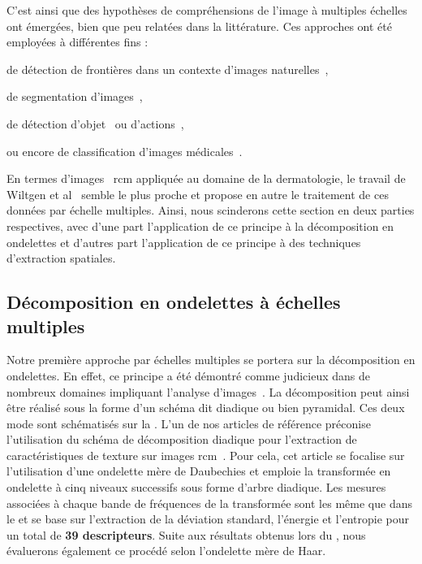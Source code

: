 C'est ainsi que des hypothèses de compréhensions de l'image à multiples échelles ont émergées, bien que peu relatées dans la littérature. Ces approches ont été employées à différentes fins : 
\begin{inlinerate}
    \item de détection de frontières dans un contexte d'images naturelles~\cite{Ren2008},
    \item de segmentation d'images~\cite{Santos2012,Arbelaez2014},
    \item de détection d'objet~\cite{Felzenszwalb2008} ou d'actions~\cite{Pedersoli2011},
    \item ou encore de classification d'images médicales~\cite{Alsaih2016,Tang2017}.
\end{inlinerate} En termes d'images ~\gls{rcm} appliquée au domaine de la dermatologie, le travail de Wiltgen et al~\cite{Wiltgen2008} semble le plus proche et propose en autre le traitement de ces données par échelle multiples. Ainsi, nous scinderons cette section en deux parties respectives, avec d'une part l'application de ce principe à la décomposition en ondelettes et d'autres part l'application de ce principe à des techniques d'extraction spatiales.\par 

\subsection{Décomposition en ondelettes à échelles multiples}
Notre première approche par échelles multiples se portera sur la décomposition en ondelettes. En effet, ce principe a été démontré comme judicieux dans de nombreux domaines impliquant l'analyse d'images~\cite{Carvalho2004}. La décomposition peut ainsi être réalisé sous la forme d'un schéma dit diadique ou bien pyramidal. Ces deux mode sont schématisés sur la . L'un de nos articles de référence préconise l'utilisation du schéma de décomposition diadique pour l'extraction de caractéristiques de texture sur images \gls{rcm}~\cite{Wiltgen2008}. Pour cela, cet article se focalise sur l'utilisation d'une ondelette mère de Daubechies et emploie la transformée en ondelette à cinq niveaux successifs sous forme d'arbre diadique. Les mesures associées à chaque bande de fréquences de la transformée sont les même que dans le  et se base sur l'extraction de la déviation standard, l'énergie et l'entropie pour un total de \textbf{39 descripteurs}. Suite aux résultats obtenus lors du , nous évaluerons également ce procédé selon l'ondelette mère de Haar.\par

